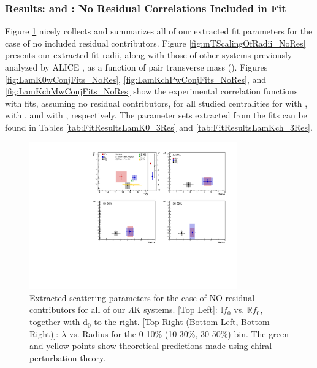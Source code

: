 \documentclass[/home/jesse/Analysis/FemtoAnalysis/AnalysisNotes/AnalysisNoteJBuxton.tex]{subfiles}
\begin{document}
\subsubsection{Results: \LamKs and \LamKpm: No Residual Correlations Included in Fit}
\label{ResultsLamK_NoRes}

Figure \ref{fig:ScattParams_NoRes} nicely collects and summarizes all of our extracted fit parameters for the case of no included residual contributors.  Figure \ref{fig:mTScalingOfRadii_NoRes} presents our extracted fit radii, along with those of other systems previously analyzed by ALICE \cite{Adam:2015vja}, as a function of pair transverse mass (\mt).
Figures \ref{fig:LamK0wConjFits_NoRes}, \ref{fig:LamKchPwConjFits_NoRes}, and \ref{fig:LamKchMwConjFits_NoRes} show the experimental correlation functions with fits, assuming no residual contributors, for all studied centralities for \LamKs with \ALamKs, \LamKchP with \ALamKchM, and \LamKchM with \ALamKchP, respectively.
The parameter sets extracted from the fits can be found in Tables \ref{tab:FitResultsLamK0_3Res} and \ref{tab:FitResultsLamKch_3Res}.


\begin{figure}[h]
  \centering
  \includegraphics[width=0.80\textwidth]{7_ResultsAndDiscussion/Figures/CompareAllScattParams_Comp3An_NoRes.pdf}
  \caption[Extracted Scattering Parameters: No Residuals in Fit]{Extracted scattering parameters for the case of NO residual contributors for all of our $\Lambda$K systems.  [Top Left]: $\mathbb{I}f_{0}$ vs. $\mathbb{R}f_{0}$, together with d$_{0}$ to the right.  [Top Right (Bottom Left, Bottom Right)]: $\lambda$ vs. Radius for the 0-10\% (10-30\%, 30-50\%) bin.  The green \cite{Liu:2006xja} and yellow \cite{Mai:2009ce} points show theoretical predictions made using chiral perturbation theory.}
  \label{fig:ScattParams_NoRes}
\end{figure}
\end{document}
